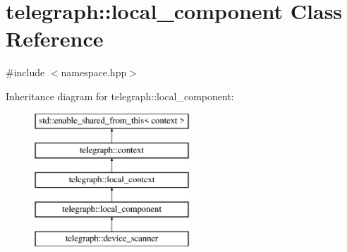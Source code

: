 \hypertarget{classtelegraph_1_1local__component}{}\section{telegraph\+:\+:local\+\_\+component Class Reference}
\label{classtelegraph_1_1local__component}


{\ttfamily \#include $<$namespace.\+hpp$>$}

Inheritance diagram for telegraph\+:\+:local\+\_\+component\+:\begin{figure}[H]
\begin{center}
\leavevmode
\includegraphics[height=5.000000cm]{classtelegraph_1_1local__component}
\end{center}
\end{figure}
